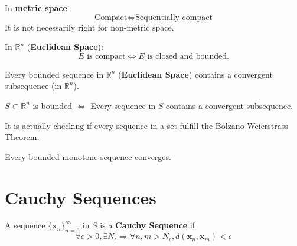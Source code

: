 \begin{proposition}
    In \textbf{metric space}: \begin{equation*}
        \text{Compact} \iff \text{Sequentially compact}
    \end{equation*}
    It is not necessarily right for non-metric space.
\end{proposition}

\begin{theorem}
    In $\mathbb{R}^{n}$ (\textbf{Euclidean Space}): \begin{equation*}
        E \text{ is compact} \iff E \text{ is closed and bounded}.
    \end{equation*}
\end{theorem}




\begin{theorem}
    Every bounded sequence in $\mathbb{R}^{n}$ (\textbf{Euclidean Space}) contains a convergent subsequence (in $\mathbb{R}^{n}$).
\end{theorem}


\begin{proposition}
    $S \subset \mathbb{R}^{n}$ is bounded $\iff$ Every sequence in $S$ contains a convergent subsequence.

    \begin{remark*}
        It is actually checking if every sequence in a set fulfill the Bolzano-Weierstrass Theorem.
    \end{remark*}
\end{proposition}

\begin{theorem}
    Every bounded monotone sequence converges.
\end{theorem}

\section{Cauchy Sequences}

\begin{definition}
    A sequence $\{\mathbf{x}_n\}_{n=0}^{\infty}$ in $S$ is a \textbf{Cauchy Sequence} if
    \begin{equation*}
        \forall \epsilon > 0, \exists N_{\epsilon} \Rightarrow \forall n,m>N_{\epsilon}, d(\mathbf{x}_n, \mathbf{x}_m) < \epsilon
    \end{equation*}
\end{definition}

